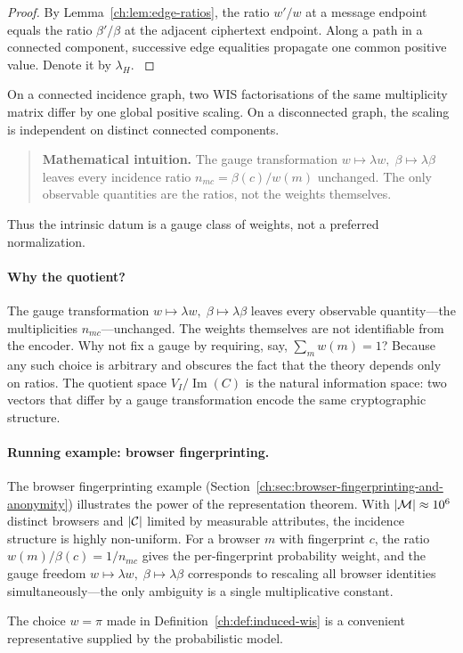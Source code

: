 \begin{proof}
By Lemma~\ref{ch:lem:edge-ratios}, the ratio \(w'/w\) at a message
endpoint equals the ratio \(\beta'/\beta\) at the adjacent ciphertext
endpoint.  Along a path in a connected component, successive edge
equalities propagate one common positive value.  Denote it by
\(\lambda_H\). \(\)
\end{proof}

\begin{corollary}\label{ch:cor:gauge}
On a connected incidence graph, two WIS factorisations of the same
multiplicity matrix differ by one global positive scaling.  On a
disconnected graph, the scaling is independent on distinct connected
components.
\end{corollary}

\begin{quote}
\textbf{Mathematical intuition.}
The gauge transformation $w\mapsto\lambda w,\;\beta\mapsto\lambda\beta$ leaves every incidence ratio $n_{mc}=\beta(c)/w(m)$ unchanged.
The only observable quantities are the ratios, not the weights themselves.
\end{quote}

Thus the intrinsic datum is a gauge class of weights, not a preferred
normalization.

\paragraph{Why the quotient?}
The gauge transformation $w\mapsto\lambda w,\;\beta\mapsto\lambda\beta$ leaves every observable quantity---the multiplicities $n_{mc}$---unchanged.  The weights themselves are not identifiable from the encoder.  Why not fix a gauge by requiring, say, $\sum_m w(m)=1$?  Because any such choice is arbitrary and obscures the fact that the theory depends only on ratios.  The quotient space $V_I/\operatorname{Im}(C)$ is the natural information space: two vectors that differ by a gauge transformation encode the same cryptographic structure.

\paragraph{Running example: browser fingerprinting.}
The browser fingerprinting example (Section~\ref{ch:sec:browser-fingerprinting-and-anonymity}) illustrates the power of the representation theorem.  With $|\mathcal{M}|\approx10^6$ distinct browsers and $|\mathcal{C}|$ limited by measurable attributes, the incidence structure is highly non-uniform.  For a browser $m$ with fingerprint $c$, the ratio $w(m)/\beta(c)=1/n_{mc}$ gives the per-fingerprint probability weight, and the gauge freedom $w\mapsto\lambda w,\;\beta\mapsto\lambda\beta$ corresponds to rescaling all browser identities simultaneously---the only ambiguity is a single multiplicative constant.

The choice \(w=\pi\) made in
Definition~\ref{ch:def:induced-wis} is a convenient representative
supplied by the probabilistic model.
